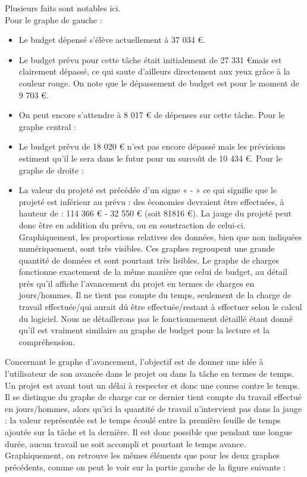 \documentclass[12pt]{report}
\begin{document}
Plusieurs faits sont notables ici.\\

Pour le graphe de gauche :\\
\begin{itemize}
\item	Le budget dépensé s’élève actuellement à 37 034 \euro{}.
\item Le budget prévu pour cette tâche était initialement de 27 331  \euro mais est clairement dépassé, ce qui saute d’ailleurs directement aux yeux grâce à la couleur rouge. On note que le dépassement de budget est pour le moment de 9 703  \euro{}.
\item On peut encore s’attendre à 8 017  \euro{} de dépenses sur cette tâche.
Pour le graphe central :
\item Le budget prévu de 18 020  \euro{} n’est pas encore dépassé mais les prévisions estiment qu’il le sera dans le futur pour un surcoût de 10 434  \euro{}.
Pour le graphe de droite : 
\item La valeur du projeté est précédée d’un signe « - » ce qui signifie que le projeté est inférieur au prévu : des économies devraient être effectuées, à hauteur de : 114 366  \euro{} - 32 550  \euro{} (soit 81816  \euro{}). La jauge du projeté peut donc être en addition du prévu, ou en soustraction de celui-ci.
Graphiquement, les proportions relatives des données, bien que non indiquées numériquement, sont très visibles. Ces graphes regroupent une grande quantité de données et sont pourtant très lisibles. Le graphe de charges fonctionne exactement de la même manière que celui de budget, au détail près qu’il affiche l’avancement du projet en termes de charges en jours/hommes. Il ne tient pas compte du temps, seulement de la charge de travail effectuée/qui aurait dû être effectuée/restant à effectuer selon le calcul du logiciel. Nous ne détaillerons pas le fonctionnement détaillé étant donné qu’il est vraiment similaire au graphe de budget pour la lecture et la compréhension.\\
\end{itemize}

Concernant le graphe d’avancement, l’objectif est de donner une idée à l’utilisateur de son avancée dans le projet ou dans la tâche en termes de temps.  Un projet est avant tout un délai à respecter et donc une course contre le temps. Il se distingue du graphe de charge car ce dernier tient compte du travail effectué en jours/hommes, alors qu’ici la quantité de travail n’intervient pas dans la jauge : la valeur représentée est le temps écoulé entre la première feuille de temps ajoutée sur la tâche et la dernière. Il est donc possible que pendant une longue durée, aucun travail ne soit accompli et pourtant le temps avance. Graphiquement, on retrouve les mêmes éléments que pour les deux graphes précédents, comme on peut le voir sur la partie gauche de la figure suivante :\\
\end{document}
